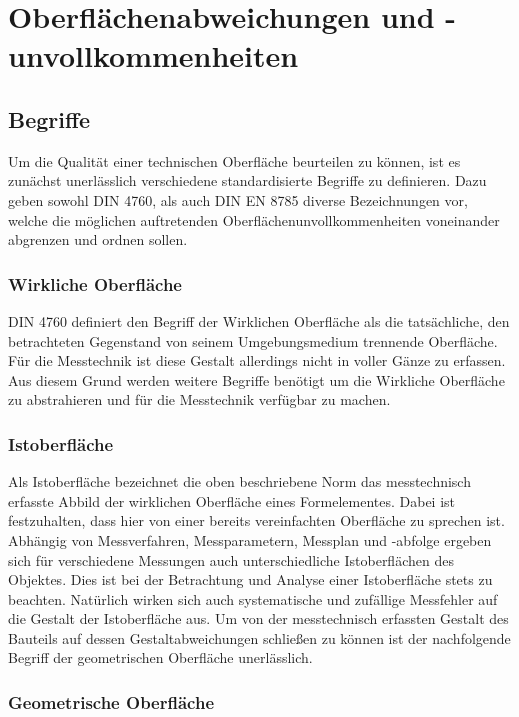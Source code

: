 \section{Oberflächenabweichungen und -unvollkommenheiten}

\subsection{Begriffe}

Um die Qualität einer technischen Oberfläche beurteilen zu können, ist es zunächst unerlässlich verschiedene standardisierte Begriffe zu definieren. Dazu geben sowohl DIN 4760, als auch DIN EN 8785 diverse Bezeichnungen vor, welche die möglichen auftretenden Oberflächenunvollkommenheiten voneinander abgrenzen und ordnen sollen.

\subsubsection{Wirkliche Oberfläche}

DIN 4760 definiert den Begriff der Wirklichen Oberfläche als die tatsächliche, den betrachteten Gegenstand von seinem Umgebungsmedium trennende Oberfläche. Für die Messtechnik ist diese Gestalt allerdings nicht in voller Gänze zu erfassen. Aus diesem Grund werden weitere Begriffe benötigt um die Wirkliche Oberfläche zu abstrahieren und für die Messtechnik verfügbar zu machen. 

\subsubsection{Istoberfläche}

Als Istoberfläche bezeichnet die oben beschriebene Norm das messtechnisch erfasste Abbild der wirklichen Oberfläche eines Formelementes. Dabei ist festzuhalten, dass hier von einer bereits vereinfachten Oberfläche zu sprechen ist. Abhängig von Messverfahren, Messparametern, Messplan und -abfolge ergeben sich für verschiedene Messungen auch unterschiedliche Ist\-oberflächen des Objektes. Dies ist bei der Betrachtung und Analyse einer Istoberfläche stets zu beachten. Natürlich wirken sich auch systematische und zufällige Messfehler auf die Gestalt der Istoberfläche aus. Um von der messtechnisch erfassten Gestalt des Bauteils auf dessen Gestaltabweichungen schließen zu können ist der nachfolgende Begriff der geometrischen Oberfläche unerlässlich. 

\subsubsection{Geometrische Oberfläche}

